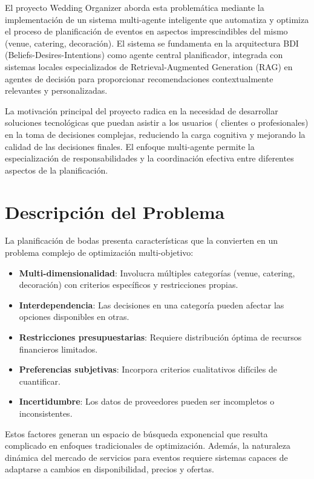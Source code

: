 \documentclass[runningheads,a4paper]{llncs}
\begin{document}
El proyecto Wedding Organizer aborda esta problemática mediante la implementación de un sistema multi-agente inteligente que automatiza y optimiza el proceso de planificación de eventos en aspectos imprescindibles del mismo (venue, catering, decoración). El sistema se fundamenta en la arquitectura BDI (Beliefs-Desires-Intentions) como agente central planificador, integrada con sistemas locales especializados de Retrieval-Augmented Generation (RAG) en agentes de decisión para proporcionar recomendaciones contextualmente relevantes y personalizadas.

La motivación principal del proyecto radica en la necesidad de desarrollar soluciones tecnológicas que puedan asistir a los usuarios ( clientes o profesionales) en la toma de decisiones complejas, reduciendo la carga cognitiva y mejorando la calidad de las decisiones finales. El enfoque multi-agente permite la especialización de responsabilidades y la coordinación efectiva entre diferentes aspectos de la planificación.

\section{Descripción del Problema}

La planificación de bodas presenta características que la convierten en un problema complejo de optimización multi-objetivo:

\begin{itemize}
    \item \textbf{Multi-dimensionalidad}: Involucra múltiples categorías (venue, catering, decoración) con criterios específicos y restricciones propias.
    \item \textbf{Interdependencia}: Las decisiones en una categoría pueden afectar las opciones disponibles en otras.
    \item \textbf{Restricciones presupuestarias}: Requiere distribución óptima de recursos financieros limitados.
    \item \textbf{Preferencias subjetivas}: Incorpora criterios cualitativos difíciles de cuantificar.
    \item \textbf{Incertidumbre}: Los datos de proveedores pueden ser incompletos o inconsistentes.
\end{itemize}

Estos factores generan un espacio de búsqueda exponencial que resulta complicado en enfoques tradicionales de optimización. Además, la naturaleza dinámica del mercado de servicios para eventos requiere sistemas capaces de adaptarse a cambios en disponibilidad, precios y ofertas.
\end{document}
